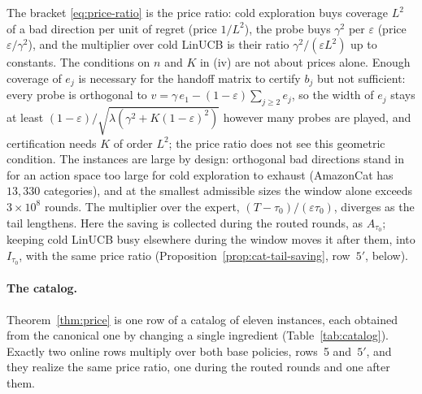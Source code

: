 \documentclass[anon]{alt2027} %
\newcommand{\eps}{\varepsilon}
\begin{document}
The bracket \eqref{eq:price-ratio} is the price ratio: cold exploration buys
coverage $L^2$ of a bad direction per unit of regret (price $1/L^2$), the
probe buys $\gamma^2$ per $\eps$ (price $\eps/\gamma^2$), and the multiplier over cold
LinUCB is their ratio $\gamma^2/(\eps L^2)$ up to constants. The conditions on
$n$ and $K$ in (iv) are not about prices alone. Enough coverage of $e_j$ is
necessary for the handoff matrix to certify $b_j$ but not sufficient: every
probe is orthogonal to $v=\gamma\,e_1-(1-\eps)\sum_{j\ge2}e_j$, so the width of
$e_j$ stays at least $(1-\eps)/\sqrt{\lambda(\gamma^2+K(1-\eps)^2)}$ however many
probes are played, and certification needs $K$ of order $L^2$; the price
ratio does not see this geometric condition. The instances are large by
design: orthogonal bad directions stand in for an action space too large for
cold exploration to exhaust (AmazonCat has $13{,}330$ categories), and at the
smallest admissible sizes the window alone exceeds $3\times10^8$ rounds. The multiplier over
the expert, $(T-\tau_0)/(\eps\tau_0)$, diverges as the tail lengthens. Here
the saving is collected during the routed rounds, as $A_{\tau_0}$; keeping
cold LinUCB busy elsewhere during the window moves it after them, into
$I_{\tau_0}$, with the same price ratio (Proposition~\ref{prop:cat-tail-saving},
row~$5'$, below).

\paragraph{The catalog.}
Theorem~\ref{thm:price} is one row of a catalog of eleven instances, each
obtained from the canonical one by changing a single ingredient
(Table~\ref{tab:catalog}). Exactly two online rows multiply over both base policies,
rows~5 and~$5'$, and they realize the same price ratio, one during the routed
rounds and one after them.
\end{document}
